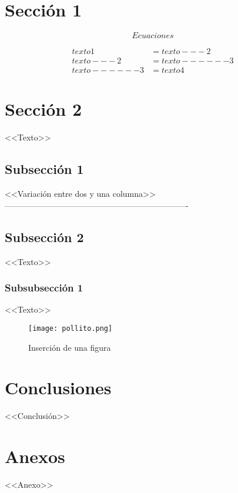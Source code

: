 \begin{multicols}{2}
\section{Sección 1} 

\begin{equation}
    Ecuaciones
\label{ecuacion}
\end{equation}

\begin{equation*} %
\begin{split}
    texto1 & = texto---2 \\
    texto---2 & = texto------3 \\
    texto------3 & = texto4
\end{split}
\end{equation*}

\section{Sección 2}

<<Texto>>

\end{multicols}

\subsection{Subsección 1}

<<Variación entre dos y una columna>> -------------------------------------------------------------------

\begin{multicols}{2}

\subsection{Subsección 2}

<<Texto>>

\subsubsection{Subsubsección 1}

<<Texto>>

\begin{figure}[H]
    \centering
    \texttt{[image: pollito.png]}
    \caption{Inserción de una figura}
    \label{figura}
\end{figure}

\section{Conclusiones}

<<Conclusión>>

\printbibliography

\end{multicols}

\section{Anexos}

<<Anexo>>

